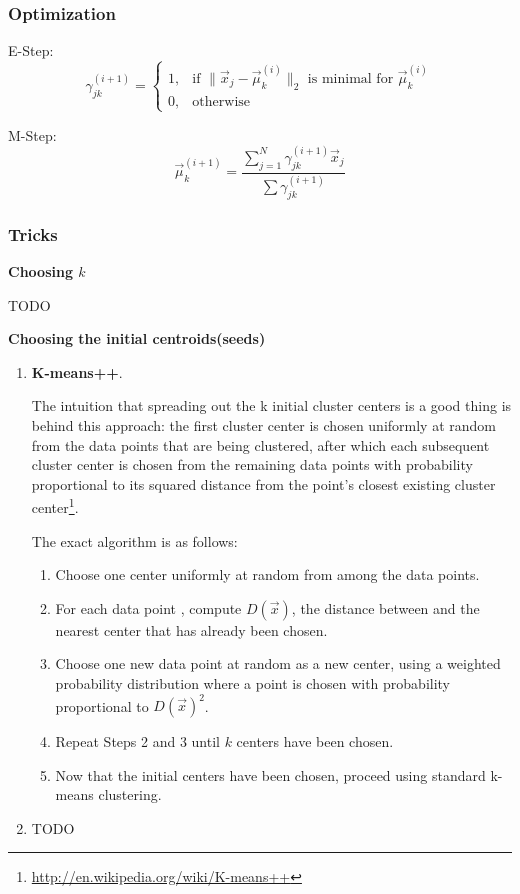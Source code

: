\subsubsection{Optimization}
E-Step:
\begin{equation}
\gamma_{jk}^{(i+1)}=\begin{cases} 
1, & \text{if } \|\vec{x}_j-\vec{\mu}_k^{(i)}\|_2 \text{ is minimal for } \vec{\mu}_k^{(i)} \\ 
0, & \text{otherwise}
\end{cases}
\end{equation}

M-Step:
\begin{equation}
\vec{\mu}_{k}^{(i+1)}= \frac{\sum_{j=1}^N{\gamma_{jk}^{(i+1)}\vec{x}_j}}{\sum \gamma_{jk}^{(i+1)}}
\end{equation}


\subsubsection{Tricks}

\textbf{Choosing $k$}

TODO

\textbf{Choosing the initial centroids(seeds)}

\begin{enumerate}
\item  \textbf{K-means++}.

The intuition that spreading out the k initial cluster centers is a good thing is behind this approach: the first cluster center is chosen uniformly at random from the data points that are being clustered, after which each subsequent cluster center is chosen from the remaining data points with probability proportional to its squared distance from the point's closest existing cluster center\footnote{\url{http://en.wikipedia.org/wiki/K-means++}}.

The exact algorithm is as follows:
\begin{enumerate}
\item Choose one center uniformly at random from among the data points.
\item For each data point , compute $D(\vec{x})$, the distance between  and the nearest center that has already been chosen.
\item Choose one new data point at random as a new center, using a weighted probability distribution where a point  is chosen with probability proportional to $D(\vec{x})^2$.
\item Repeat Steps 2 and 3 until $k$ centers have been chosen.
\item Now that the initial centers have been chosen, proceed using standard k-means clustering.
\end{enumerate}
\item TODO
\end{enumerate}


